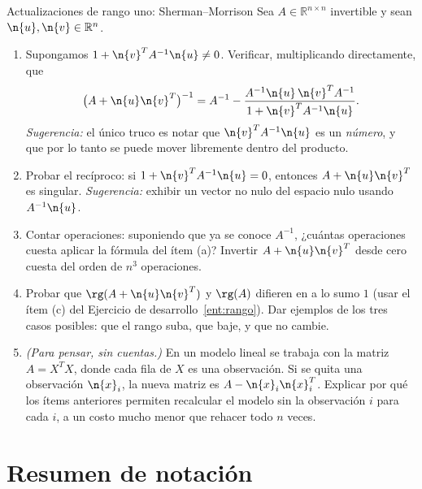 \begin{entrega}{Actualizaciones de rango uno: Sherman--Morrison}\label{ent:sherman}
Sea $A\in\mathbb{R}^{n\times n}$ invertible y sean $\n{u},\n{v}\in\mathbb{R}^n$.

\begin{enumerate}[label=\textbf{(\alph*)},itemsep=3pt,topsep=4pt]
\item Supongamos $1+\n{v}^TA^{-1}\n{u}\neq0$. Verificar, multiplicando
directamente, que
\[
\big(A+\n{u}\n{v}^T\big)^{-1}
= A^{-1} - \frac{A^{-1}\n{u}\,\n{v}^TA^{-1}}{1+\n{v}^TA^{-1}\n{u}} .
\]
\emph{Sugerencia:} el único truco es notar que $\n{v}^TA^{-1}\n{u}$ es un
\emph{número}, y que por lo tanto se puede mover libremente dentro del producto.

\item Probar el recíproco: si $1+\n{v}^TA^{-1}\n{u}=0$, entonces
$A+\n{u}\n{v}^T$ es singular. \emph{Sugerencia:} exhibir un vector no nulo del
espacio nulo usando $A^{-1}\n{u}$.

\item Contar operaciones: suponiendo que ya se conoce $A^{-1}$, ¿cuántas
operaciones cuesta aplicar la fórmula del ítem (a)? Invertir
$A+\n{u}\n{v}^T$ desde cero cuesta del orden de $n^3$ operaciones.

\item Probar que $\rg(A+\n{u}\n{v}^T)$ y $\rg(A)$ difieren en a lo sumo $1$
(usar el ítem (c) del Ejercicio de desarrollo~\ref{ent:rango}). Dar ejemplos de
los tres casos posibles: que el rango suba, que baje, y que no cambie.

\item \emph{(Para pensar, sin cuentas.)} En un modelo lineal se trabaja con la
matriz $A = X^TX$, donde cada fila de $X$ es una observación. Si se quita una
observación $\n{x}_i$, la nueva matriz es $A - \n{x}_i\n{x}_i^T$. Explicar por
qué los ítems anteriores permiten recalcular el modelo sin la observación $i$
para cada $i$, a un costo mucho menor que rehacer todo $n$ veces.
\end{enumerate}

\medskip
{}
\end{entrega}

\section{Resumen de notación}

